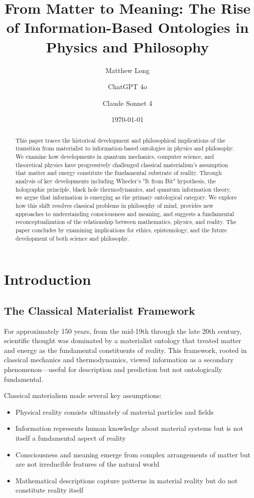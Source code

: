 \documentclass[12pt]{article}
\title{From Matter to Meaning: The Rise of Information-Based Ontologies in Physics and Philosophy}
\author[1]{Matthew Long}
\author[2]{ChatGPT 4o}
\author[3]{Claude Sonnet 4}
\affil[1]{Yoneda AI}
\affil[2]{OpenAI}
\affil[3]{Anthropic}
\date{\today}
\begin{document}
\maketitle

\begin{abstract}
This paper traces the historical development and philosophical implications of the transition from materialist to information-based ontologies in physics and philosophy. We examine how developments in quantum mechanics, computer science, and theoretical physics have progressively challenged classical materialism's assumption that matter and energy constitute the fundamental substrate of reality. Through analysis of key developments including Wheeler's "It from Bit" hypothesis, the holographic principle, black hole thermodynamics, and quantum information theory, we argue that information is emerging as the primary ontological category. We explore how this shift resolves classical problems in philosophy of mind, provides new approaches to understanding consciousness and meaning, and suggests a fundamental reconceptualization of the relationship between mathematics, physics, and reality. The paper concludes by examining implications for ethics, epistemology, and the future development of both science and philosophy.
\end{abstract}

\onehalfspacing

\tableofcontents

\newpage

\section{Introduction}

\subsection{The Classical Materialist Framework}

For approximately 150 years, from the mid-19th through the late 20th century, scientific thought was dominated by a materialist ontology that treated matter and energy as the fundamental constituents of reality. This framework, rooted in classical mechanics and thermodynamics, viewed information as a secondary phenomenon—useful for description and prediction but not ontologically fundamental.

Classical materialism made several key assumptions:
\begin{itemize}
\item Physical reality consists ultimately of material particles and fields
\item Information represents human knowledge about material systems but is not itself a fundamental aspect of reality
\item Consciousness and meaning emerge from complex arrangements of matter but are not irreducible features of the natural world
\item Mathematical descriptions capture patterns in material reality but do not constitute reality itself
\end{itemize}
\end{document}
